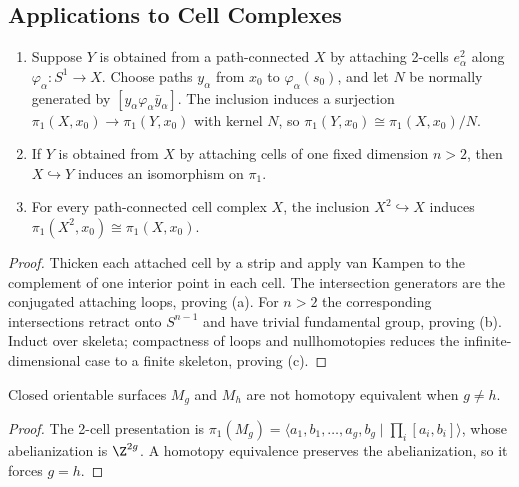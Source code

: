 \subsection*{Applications to Cell Complexes}

\begin{proposition}
\label{prop:attaching-cells-pi1}

\begin{enumerate}
\item[(a)] Suppose $Y$ is obtained from a path-connected $X$ by attaching
2-cells $e_\alpha^2$ along $\varphi_\alpha:S^1\to X$. Choose paths $y_\alpha$
from $x_0$ to $\varphi_\alpha(s_0)$, and let $N$ be normally generated by
$[y_\alpha\varphi_\alpha\bar y_\alpha]$. The inclusion induces a surjection
$\pi_1(X,x_0)\to\pi_1(Y,x_0)$ with kernel $N$, so
$\pi_1(Y,x_0)\cong\pi_1(X,x_0)/N$.
\item[(b)] If $Y$ is obtained from $X$ by attaching cells of one fixed
dimension $n>2$, then $X\hookrightarrow Y$ induces an isomorphism on
$\pi_1$.
\item[(c)] For every path-connected cell complex $X$, the inclusion
$X^2\hookrightarrow X$ induces
$\pi_1(X^2,x_0)\cong\pi_1(X,x_0)$.
\end{enumerate}
\end{proposition}

\begin{proof}
\sketch Thicken each attached cell by a strip and apply van Kampen to the
complement of one interior point in each cell. The intersection generators are
the conjugated attaching loops, proving (a). For $n>2$ the corresponding
intersections retract onto $S^{n-1}$ and have trivial fundamental group,
proving (b). Induct over skeleta; compactness of loops and nullhomotopies
reduces the infinite-dimensional case to a finite skeleton, proving (c).
\end{proof}

\begin{corollary}
\label{cor:genus-surfaces-distinct}

Closed orientable surfaces $M_g$ and $M_h$ are not homotopy equivalent when
$g\ne h$.
\end{corollary}

\begin{proof}
\sketch The 2-cell presentation is
$\pi_1(M_g)=\langle a_1,b_1,\ldots,a_g,b_g\mid\prod_i[a_i,b_i]\rangle$,
whose abelianization is $\Z^{2g}$. A homotopy equivalence preserves the
abelianization, so it forces $g=h$.
\end{proof}

